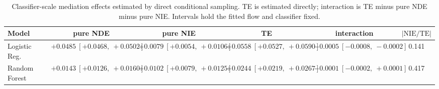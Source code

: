 \begin{table}[htbp]
  \centering
  \caption{Classifier-scale mediation effects estimated by direct conditional sampling. TE is estimated directly; interaction is TE minus pure NDE minus pure NIE. Intervals hold the fitted flow and classifier fixed.}
  \label{tab:german_gap_overall}
  \begin{tabular}{lccccc}
    \toprule
    Model & pure NDE & pure NIE & TE & interaction & $|\mathrm{NIE}/\mathrm{TE}|$ \\
    \midrule
    Logistic Reg. & $+0.0485\ [+0.0468,\ +0.0502]$ & $+0.0079\ [+0.0054,\ +0.0106]$ & $+0.0558\ [+0.0527,\ +0.0590]$ & $-0.0005\ [-0.0008,\ -0.0002]$ & 0.141 \\
    Random Forest & $+0.0143\ [+0.0126,\ +0.0160]$ & $+0.0102\ [+0.0079,\ +0.0125]$ & $+0.0244\ [+0.0219,\ +0.0267]$ & $-0.0001\ [-0.0002,\ +0.0001]$ & 0.417 \\
    \bottomrule
  \end{tabular}
\end{table}